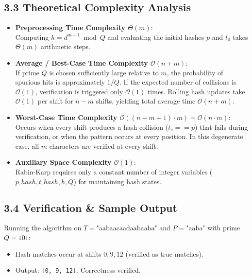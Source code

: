 \documentclass[12pt]{article}
\begin{document}
\subsection*{3.3 Theoretical Complexity Analysis}
\begin{itemize}
    \item \textbf{Preprocessing Time Complexity $\Theta(m)$}:\\
    Computing $h = d^{m-1} \bmod Q$ and evaluating the initial hashes $p$ and $t_0$ takes $\Theta(m)$ arithmetic steps.

    \item \textbf{Average / Best-Case Time Complexity $\mathcal{O}(n + m)$}:\\
    If prime $Q$ is chosen sufficiently large relative to $m$, the probability of spurious hits is approximately $1/Q$. If the expected number of collisions is $\mathcal{O}(1)$, verification is triggered only $\mathcal{O}(1)$ times. Rolling hash updates take $\mathcal{O}(1)$ per shift for $n-m$ shifts, yielding total average time $\mathcal{O}(n + m)$.

    \item \textbf{Worst-Case Time Complexity $\mathcal{O}((n - m + 1) \cdot m) = \mathcal{O}(n \cdot m)$}:\\
    Occurs when every shift produces a hash collision ($t_s == p$) that fails during verification, or when the pattern occurs at every position. In this degenerate case, all $m$ characters are verified at every shift.

    \item \textbf{Auxiliary Space Complexity $\mathcal{O}(1)$}:\\
    Rabin-Karp requires only a constant number of integer variables ($p\_hash, t\_hash, h, Q$) for maintaining hash states.
\end{itemize}

\subsection*{3.4 Verification \& Sample Output}
Running the algorithm on $T = \text{"aabaacaadaabaaba"}$ and $P = \text{"aaba"}$ with prime $Q = 101$:
\begin{itemize}
    \item Hash matches occur at shifts $0, 9, 12$ (verified as true matches).
    \item Output: \texttt{[0, 9, 12]}. Correctness verified.
\end{itemize}
\end{document}
